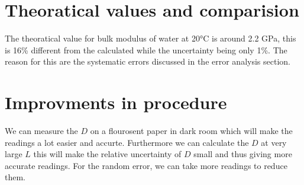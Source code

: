 \documentclass[%
sor,
 jor,
 amsmath,amssymb,
 reprint,
longbibliography,
]{revtex4-2}
\begin{document}


\hfill\pagebreak

\section{Theoratical values and comparision}
The theoratical value for bulk modulus of water at 20\si{\celsius} is around 2.2 GPa, this is 16\% different from the calculated while the uncertainty being only 1\%. The reason for this are the systematic errors discussed in the error analysis section.
\section{Improvments in procedure}
We can measure the $D$ on a flourosent paper in dark room which will make the readings a lot easier and accurte. Furthermore we can calculate the $D$ at very large $L$ this will make the relative uncertainty of $D$ small and thus giving more accurate readings. For the random error, we can take more readings to reduce them.
\end{document}
